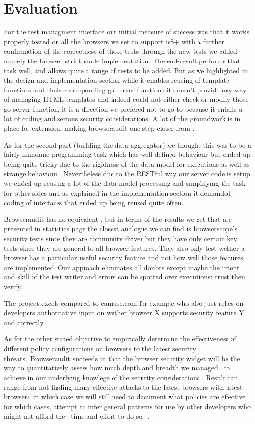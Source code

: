 \chapter{Evaluation}


For the test managment interface our initial measure of success was that it works properly tested on all the browsers we set to support
ie8+ with a further confirmation of the correctness of those tests through the new tests we added namely the browser strict mode implementation.
The end-result performs that task well, and allows quite a range of tests to be added. But as we highlighted in the design and implementation section
while it enables reusing of template functions and their corresponding go server functions it doesn't provide any way of managing HTML templates
and indeed could not either check or modify those go server function, it is a direction we prefered not to go to because it entails a lot of coding
and serious security considerations. A lot of the groundwork is in place for extension, making browseraudit one step closer from .


As for the second part (building the data aggregator) we thought this was to be a fairly mundane programming task which has well defined behaviour
but ended up being quite tricky due to the rigidness of the data model for executions as well as strange behaviour  \
Nevertheless due to the RESTful way our server code is setup we ended up reusing a lot of the data model processing and simplifying the task
for other sides and as explained in the implementation section it demanded coding of interfaces that ended up being reused quite often.

Browseraudit has no equivalent , but in terms of the results we get that are presented in statistics page the closest analogue we can find is
browserscope's security tests \cite{browsercope} since they are community driver but they have only certain key tests since they are general to all
browser features. They also only test wether a browser has a particular useful security feature and not how well those features are implemented.
Our approach eliminates all doubts except maybe the intent and skill of the test writer and errors can be spotted over executions: trust then verify.

The project excels compared to caniuse.com for example who also just relies on developers authoritative input on wether browser X supports security
feature Y and correctly.



As for the other stated objective to empirically determine the effectiveness of different policy configurations on browsers to the latest security threats.\
Browseraudit succeeds in that the browser security widget will be the way to quantitatively assess how much depth and breadth we managed \
to achieve in our underlying knowlege of the security considerations . Result can range from not finding many effective attacks to the latest browsers with latest browsers\
in which case we will still need to document what policies are effective for which cases, attempt to infer general patterns for use by other developers who might not afford the \
time and effort to do so.\ .
